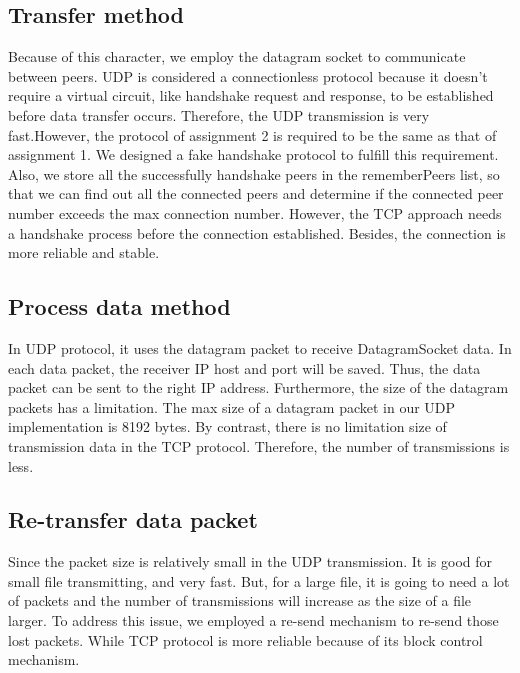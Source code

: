 \documentclass[a4paper,10pt,titlepage,twocolumn]{article}
\begin{document}
    \subsection{Transfer method}
    Because of this character, we employ the datagram socket to communicate between peers. UDP is considered a connectionless protocol because it doesn't require a virtual circuit, like handshake request and response, to be established before data transfer occurs. Therefore, the UDP transmission is very fast.However, the protocol of assignment 2 is required to be the same as that of assignment 1. We designed a fake handshake protocol to fulfill this requirement. Also, we store all the successfully handshake peers in the rememberPeers list, so that we can find out all the connected peers and determine if the connected peer number exceeds the max connection number. However, the TCP approach needs a handshake process before the connection established. Besides, the connection is more reliable and stable.
    \subsection{Process data method}    
    In UDP protocol, it uses the datagram packet to receive DatagramSocket data. In each data packet, the receiver IP host and port will be saved. Thus, the data packet can be sent to the right IP address. Furthermore, the size of the datagram packets has a limitation. The max size of a datagram packet in our UDP implementation is 8192 bytes. By contrast, there is no limitation size of transmission data in the TCP protocol. Therefore, the number of transmissions is less.
    \subsection{Re-transfer data packet}    
    Since the packet size is relatively small in the UDP transmission. It is good for small file transmitting, and very fast. But, for a large file, it is going to need a lot of packets and the number of transmissions will increase as the size of a file larger. To address this issue, we employed a re-send mechanism to re-send those lost packets. While TCP protocol is more reliable because of its block control mechanism.
\end{document}

